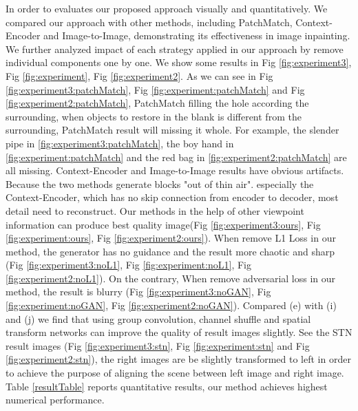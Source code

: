 \documentclass{IEEE_lsens}
\begin{document}
In order to evaluates our proposed approach visually and quantitatively. We compared our approach with other methods, including PatchMatch, Context-Encoder and Image-to-Image, demonstrating its effectiveness in image inpainting. We further analyzed impact of each strategy applied in our approach by remove individual components one by one. We show some results in Fig \ref{fig:experiment3}, Fig \ref{fig:experiment}, Fig \ref{fig:experiment2}. As we can see in Fig \ref{fig:experiment3:patchMatch}, Fig \ref{fig:experiment:patchMatch} and Fig \ref{fig:experiment2:patchMatch}, PatchMatch filling the hole according the surrounding, when objects to restore in the blank is different from the surrounding, PatchMatch result will missing it whole. For example, the slender pipe in \ref{fig:experiment3:patchMatch}, the boy hand in \ref{fig:experiment:patchMatch} and the red bag in \ref{fig:experiment2:patchMatch} are all missing. Context-Encoder and Image-to-Image results have obvious artifacts. Because the two methods generate blocks "out of thin air". especially the Context-Encoder, which has no skip connection from encoder to decoder, most detail need to reconstruct. Our methods in the help of other viewpoint information can produce best quality image(Fig \ref{fig:experiment3:ours}, Fig \ref{fig:experiment:ours}, Fig \ref{fig:experiment2:ours}). When remove L1 Loss in our method, the generator has no guidance and the result more chaotic and sharp (Fig \ref{fig:experiment3:noL1}, Fig \ref{fig:experiment:noL1}, Fig \ref{fig:experiment2:noL1}). On the contrary, When remove adversarial loss in our method, the result is blurry (Fig \ref{fig:experiment3:noGAN}, Fig \ref{fig:experiment:noGAN}, Fig \ref{fig:experiment2:noGAN}). Compared (e) with (i) and (j) we find that using group convolution, channel shuffle and spatial transform networks can improve the quality of result images slightly. See the STN result images (Fig \ref{fig:experiment3:stn}, Fig \ref{fig:experiment:stn} and Fig \ref{fig:experiment2:stn}), the right images are be slightly transformed to left in order to achieve the purpose of aligning the scene between left image and right image. Table \ref{resultTable} reports quantitative results, our method achieves highest numerical performance. 
\end{document}
